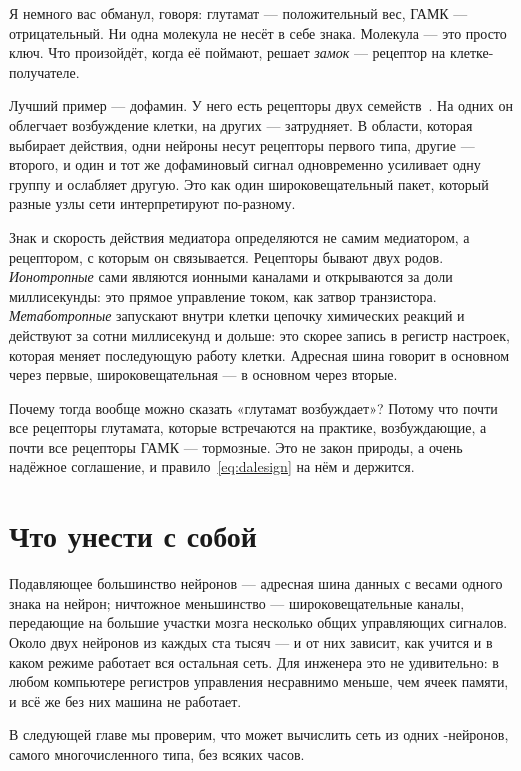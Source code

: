 Я немного вас обманул, говоря: глутамат --- положительный вес, ГАМК --- отрицательный. Ни одна молекула не несёт в себе знака. Молекула --- это просто ключ. Что произойдёт, когда её поймают, решает \emph{замок} --- рецептор на клетке-получателе.

Лучший пример --- дофамин. У него есть рецепторы двух семейств~\cite{Beaulieu2011}. На одних он облегчает возбуждение клетки, на других --- затрудняет. В области, которая выбирает действия, одни нейроны несут рецепторы первого типа, другие --- второго, и один и тот же дофаминовый сигнал одновременно усиливает одну группу и ослабляет другую. Это как один широковещательный пакет, который разные узлы сети интерпретируют по-разному.

\begin{keyblock}
\begin{proposition}
\label{prop:receptor}
Знак и скорость действия медиатора определяются не самим медиатором, а рецептором, с которым он связывается. Рецепторы бывают двух родов. \emph{Ионотропные} сами являются ионными каналами и открываются за доли миллисекунды: это прямое управление током, как затвор транзистора. \emph{Метаботропные} запускают внутри клетки цепочку химических реакций и действуют за сотни миллисекунд и дольше: это скорее запись в регистр настроек, которая меняет последующую работу клетки. Адресная шина говорит в основном через первые, широковещательная --- в основном через вторые.
\end{proposition}
\end{keyblock}

Почему тогда вообще можно сказать «глутамат возбуждает»? Потому что почти все рецепторы глутамата, которые встречаются на практике, возбуждающие, а почти все рецепторы ГАМК --- тормозные. Это не закон природы, а очень надёжное соглашение, и правило~\eqref{eq:dalesign} на нём и держится.

\section{Что унести с собой}

Подавляющее большинство нейронов --- адресная шина данных с весами одного знака на нейрон; ничтожное меньшинство --- широковещательные каналы, передающие на большие участки мозга несколько общих управляющих сигналов. Около двух нейронов из каждых ста тысяч --- и от них зависит, как учится и в каком режиме работает вся остальная сеть. Для инженера это не удивительно: в любом компьютере регистров управления несравнимо меньше, чем ячеек памяти, и всё же без них машина не работает.

В следующей главе мы проверим, что может вычислить сеть из одних -нейронов, самого многочисленного типа, без всяких часов.
